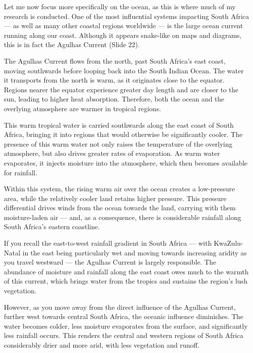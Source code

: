 \documentclass[
  10pt,
]{book}
\begin{document}
Let me now focus more specifically on the ocean, as this is where much
of my research is conducted. One of the most influential systems
impacting South Africa --- as well as many other coastal regions
worldwide --- is the large ocean current running along our coast.
Although it appears snake-like on maps and diagrams, this is in fact the
Agulhas Current (Slide 22).

The Agulhas Current flows from the north, past South Africa's east
coast, moving southwards before looping back into the South Indian
Ocean. The water it transports from the north is warm, as it originates
close to the equator. Regions nearer the equator experience greater day
length and are closer to the sun, leading to higher heat absorption.
Therefore, both the ocean and the overlying atmosphere are warmer in
tropical regions.

This warm tropical water is carried southwards along the east coast of
South Africa, bringing it into regions that would otherwise be
significantly cooler. The presence of this warm water not only raises
the temperature of the overlying atmosphere, but also drives greater
rates of evaporation. As warm water evaporates, it injects moisture into
the atmosphere, which then becomes available for rainfall.

Within this system, the rising warm air over the ocean creates a
low-pressure area, while the relatively cooler land retains higher
pressure. This pressure differential drives winds from the ocean towards
the land, carrying with them moisture-laden air --- and, as a
consequence, there is considerable rainfall along South Africa's eastern
coastline.

If you recall the east-to-west rainfall gradient in South Africa ---
with KwaZulu-Natal in the east being particularly wet and moving towards
increasing aridity as you travel westward --- the Agulhas Current is
largely responsible. The abundance of moisture and rainfall along the
east coast owes much to the warmth of this current, which brings water
from the tropics and sustains the region's lush vegetation.

However, as you move away from the direct influence of the Agulhas
Current, further west towards central South Africa, the oceanic
influence diminishes. The water becomes colder, less moisture evaporates
from the surface, and significantly less rainfall occurs. This renders
the central and western regions of South Africa considerably drier and
more arid, with less vegetation and runoff.
\end{document}
